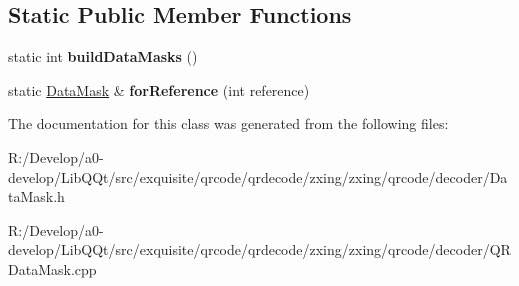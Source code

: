 \subsection*{Static Public Member Functions}
\begin{DoxyCompactItemize}
\item 
\mbox{\label{classzxing_1_1qrcode_1_1_data_mask_ad7f4e304eb4352239997c4427dca06b3}} 
static int {\bfseries build\+Data\+Masks} ()
\item 
\mbox{\label{classzxing_1_1qrcode_1_1_data_mask_a064bfc6e977ffe637e3069b6001cf341}} 
static \mbox{\hyperlink{classzxing_1_1qrcode_1_1_data_mask}{Data\+Mask}} \& {\bfseries for\+Reference} (int reference)
\end{DoxyCompactItemize}


The documentation for this class was generated from the following files\+:\begin{DoxyCompactItemize}
\item 
R\+:/\+Develop/a0-\/develop/\+Lib\+Q\+Qt/src/exquisite/qrcode/qrdecode/zxing/zxing/qrcode/decoder/Data\+Mask.\+h\item 
R\+:/\+Develop/a0-\/develop/\+Lib\+Q\+Qt/src/exquisite/qrcode/qrdecode/zxing/zxing/qrcode/decoder/Q\+R\+Data\+Mask.\+cpp\end{DoxyCompactItemize}
